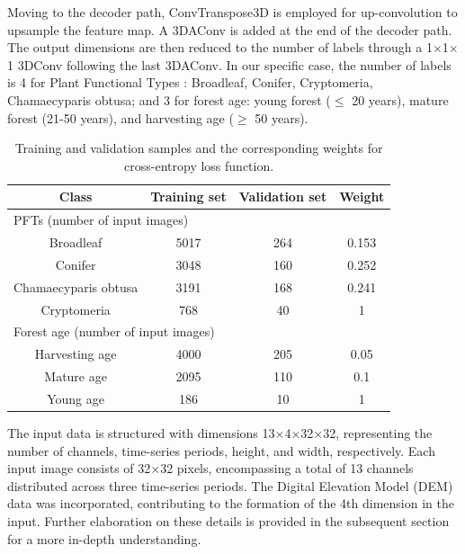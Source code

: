 Moving to the decoder path, ConvTranspose3D is employed for up-convolution to upsample the feature map. A 3DAConv is added at the end of the decoder path. The output dimensions are then reduced to the number of labels through a 1$\times$1$\times$1 3DConv following the last 3DAConv. In our specific case, the number of labels is 4 for Plant Functional Types : Broadleaf, Conifer, Cryptomeria, Chamaecyparis obtusa; and 3 for forest age: young forest ($\le$ 20 years), mature forest (21-50 years), and harvesting age ($\ge$ 50 years). \par

\begin{table}[tbh!]
    \centering
    \caption[Samples, weights for cross-entropy loss training]{Training and validation samples and the corresponding weights for cross-entropy loss function.}
    \begin{tabular}{c c c c}
    \hline
        Class   & Training set  & Validation set & Weight \\ \hline
        \multicolumn{4}{l}{PFTs (number of input images)} \\ \hline
        Broadleaf   & 5017  & 264  & 0.153 \\ 
        Conifer  & 3048  & 160  & 0.252  \\ 
        Chamaecyparis obtusa   & 3191  & 168  & 0.241 \\ 
        Cryptomeria  & 768  & 40  & 1 \\ \hline
        \multicolumn{4}{l}{Forest age (number of input images)} \\ \hline
        Harvesting age   & 4000  & 205  & 0.05 \\ 
        Mature age  & 2095  & 110  & 0.1  \\ 
        Young age   & 186  & 10 & 1 \\ \hline
    \end{tabular}
    \label{tab:chap5_tab1}
\end{table}

The input data is structured with dimensions 13×4×32×32, representing the number of channels, time-series periods, height, and width, respectively. Each input image consists of 32×32 pixels, encompassing a total of 13 channels distributed across three time-series periods. The Digital Elevation Model (DEM) data was incorporated, contributing to the formation of the 4th dimension in the input. Further elaboration on these details is provided in the subsequent section for a more in-depth understanding. \par

